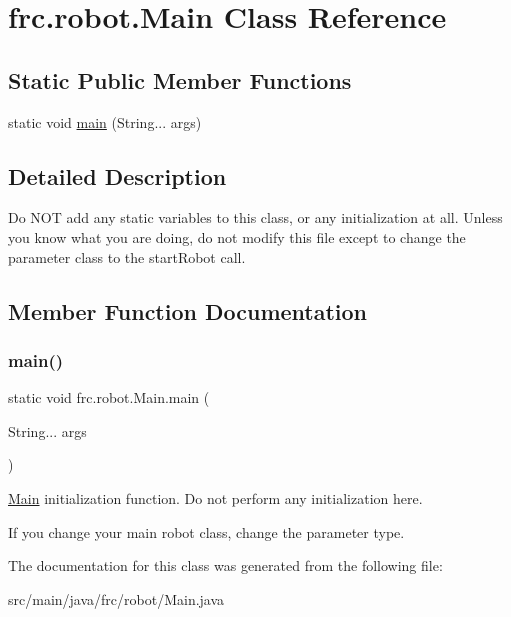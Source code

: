 \hypertarget{classfrc_1_1robot_1_1_main}{}\section{frc.\+robot.\+Main Class Reference}
\label{classfrc_1_1robot_1_1_main}
\subsection*{Static Public Member Functions}
\begin{DoxyCompactItemize}
\item 
static void \hyperlink{classfrc_1_1robot_1_1_main_ae60066a646cefc16d3e7d57b8fa22097}{main} (String... args)
\end{DoxyCompactItemize}


\subsection{Detailed Description}
Do N\+OT add any static variables to this class, or any initialization at all. Unless you know what you are doing, do not modify this file except to change the parameter class to the start\+Robot call. 

\subsection{Member Function Documentation}
\mbox{\label{classfrc_1_1robot_1_1_main_ae60066a646cefc16d3e7d57b8fa22097}} 
\subsubsection{\texorpdfstring{main()}{main()}}
{\footnotesize\ttfamily static void frc.\+robot.\+Main.\+main (\begin{DoxyParamCaption}\item[{String...}]{args }\end{DoxyParamCaption})\hspace{0.3cm}{\ttfamily [static]}}

\hyperlink{classfrc_1_1robot_1_1_main}{Main} initialization function. Do not perform any initialization here.

If you change your main robot class, change the parameter type. 

The documentation for this class was generated from the following file\+:\begin{DoxyCompactItemize}
\item 
src/main/java/frc/robot/Main.\+java\end{DoxyCompactItemize}
